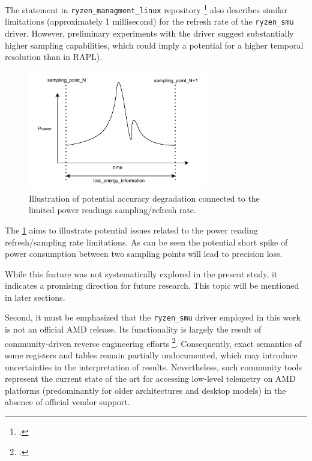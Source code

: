 The statement in \texttt{ryzen\_managment\_linux} repository
\footcite{ryzen_managment_linux} also describes similar limitations
(approximately 1 millisecond) for the refresh rate of the \texttt{ryzen\_smu}
driver. However, preliminary experiments with the driver suggest substantially
higher sampling capabilities, which could imply a potential for a higher
temporal resolution than in \gls{RAPL}).

\begin{figure}[htbp]
    \centering
    \includegraphics[width=0.7\textwidth]{assets/sampling_spike}
    \caption{
        Illustration of potential accuracy degradation connected
        to the limited power readings sampling/refresh rate.
    }
    \label{fig:sampling}
\end{figure}

The \cref{fig:sampling} aims to illustrate potential issues related to the
power reading refresh/sampling rate limitations. As can be seen the potential
short spike of power consumption between two sampling points will lead to
precision loss.

While this feature was not systematically explored in the present study, it
indicates a promising direction for future research. This topic will be
mentioned in later sections.

Second, it must be emphasized that the \texttt{ryzen\_smu} driver employed in
this work is not an official AMD release. Its functionality is largely the
result of community-driven reverse engineering efforts
\footcite{RyzenMonitor_GitHub,ryzen_managment_linux}. Consequently, exact
semantics of some registers and tables remain partially undocumented, which may
introduce uncertainties in the interpretation of results. Nevertheless, such
community tools represent the current state of the art for accessing low-level
telemetry on AMD platforms (predominantly for older architectures and desktop 
models) in the absence of official vendor support.

